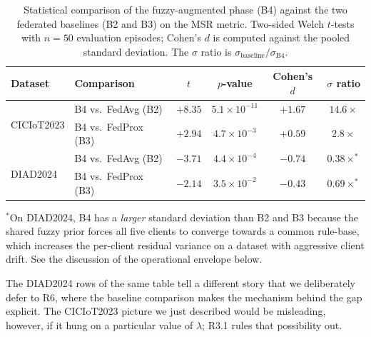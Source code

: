 \documentclass[journal]{IEEEtran}
\begin{document}
\begin{table}[!htbp]
  \centering
  \caption{Statistical comparison of the fuzzy-augmented phase (B4)
  against the two federated baselines (B2 and B3) on the MSR metric.
  Two-sided Welch $t$-tests with $n = 50$ evaluation episodes; Cohen's
  $d$ is computed against the pooled standard deviation. The $\sigma$
  ratio is $\sigma_{\text{baseline}}/\sigma_{\text{B4}}$.}\label{tab:stats}
  \small
  \begin{tabular}{@{}llcccc@{}}
    \toprule
    \textbf{Dataset} & \textbf{Comparison} & $t$ & $p$-value & \textbf{Cohen's $d$} & $\sigma$ \textbf{ratio} \\
    \midrule
    \multirow{2}{*}{CICIoT2023}
      & B4 vs.\ FedAvg (B2)  & $+8.35$ & $5.1 \times 10^{-11}$ & $+1.67$ & $14.6\times$ \\
      & B4 vs.\ FedProx (B3) & $+2.94$ & $4.7 \times 10^{-3}$  & $+0.59$ & $2.8\times$ \\
    \midrule
    \multirow{2}{*}{DIAD2024}
      & B4 vs.\ FedAvg (B2)  & $-3.71$ & $4.4 \times 10^{-4}$  & $-0.74$ & $0.38\times^{\ast}$ \\
      & B4 vs.\ FedProx (B3) & $-2.14$ & $3.5 \times 10^{-2}$  & $-0.43$ & $0.69\times^{\ast}$ \\
    \bottomrule
  \end{tabular}

  \vspace{0.25em}
  {\footnotesize $^{\ast}$On DIAD2024, B4 has a \emph{larger} standard
  deviation than B2 and B3 because the shared fuzzy prior forces all five
  clients to converge towards a common rule-base, which increases the
  per-client residual variance on a dataset with aggressive client drift.
  See the discussion of the operational envelope below.}
\end{table}

The DIAD2024 rows of the same table tell a different story that we
deliberately defer to R6, where the baseline comparison makes the
mechanism behind the gap explicit. The CICIoT2023 picture we just
described would be misleading, however, if it hung on a particular
value of $\lambda$; R3.1 rules that possibility out.
\end{document}
